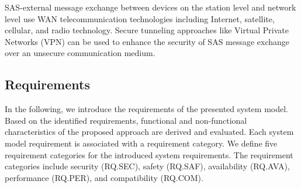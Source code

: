 SAS-external message exchange between devices on the station level and network level use WAN telecommunication technologies including Internet, satellite, cellular, and radio technology.
Secure tunneling approaches like Virtual Private Networks (VPN) can be used to enhance the security of SAS message exchange over an unsecure communication medium.


\subsection{Requirements}
In the following, we introduce the requirements of the presented system model.
Based on the identified requirements, functional and non-functional characteristics of the proposed approach are derived and evaluated.
Each system model requirement is associated with a requirement category.
We define five requirement categories for the introduced system requirements.
The requirement categories include security (RQ.SEC), safety (RQ.SAF), availability (RQ.AVA), performance (RQ.PER), and compatibility (RQ.COM).

